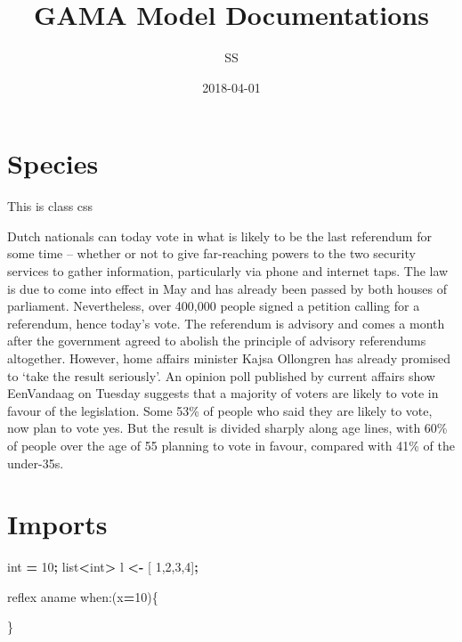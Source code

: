 \documentclass[]{book}
\title{GAMA Model Documentations}
\author{SS}
\date{2018-04-01}
\newenvironment{Shaded}{\begin{snugshade}}{\end{snugshade}}
\newcommand{\DecValTok}[1]{\textcolor[rgb]{0.00,0.00,0.81}{#1}}
\newcommand{\OperatorTok}[1]{\textcolor[rgb]{0.81,0.36,0.00}{\textbf{#1}}}
\newcommand{\BuiltInTok}[1]{#1}
\newcommand{\NormalTok}[1]{#1}
\begin{document}
\maketitle

{
\setcounter{tocdepth}{1}
\tableofcontents
}
\chapter{Species}\label{species}

 This is class css

Dutch nationals can today vote in what is likely to be the last
referendum for some time -- whether or not to give far-reaching powers
to the two security services to gather information, particularly via
phone and internet taps. The law is due to come into effect in May and
has already been passed by both houses of parliament. Nevertheless, over
400,000 people signed a petition calling for a referendum, hence today's
vote. The referendum is advisory and comes a month after the government
agreed to abolish the principle of advisory referendums altogether.
However, home affairs minister Kajsa Ollongren has already promised to
`take the result seriously'. An opinion poll published by current
affairs show EenVandaag on Tuesday suggests that a majority of voters
are likely to vote in favour of the legislation. Some 53\% of people who
said they are likely to vote, now plan to vote yes. But the result is
divided sharply along age lines, with 60\% of people over the age of 55
planning to vote in favour, compared with 41\% of the under-35s.

\chapter{Imports}\label{imports}

\begin{Shaded}
\begin{Highlighting}[]
\BuiltInTok{int} \OperatorTok{=} \DecValTok{10}\OperatorTok{;}
\BuiltInTok{list}\OperatorTok{<}\BuiltInTok{int}\OperatorTok{>}\NormalTok{ l }\OperatorTok{<-}\NormalTok{ [ }\DecValTok{1}\NormalTok{,}\DecValTok{2}\NormalTok{,}\DecValTok{3}\NormalTok{,}\DecValTok{4}\NormalTok{]}\OperatorTok{;}

\NormalTok{reflex aname when:(x}\OperatorTok{=}\DecValTok{10}\NormalTok{)\{}

\NormalTok{\}}
\end{Highlighting}
\end{Shaded}
\end{document}
